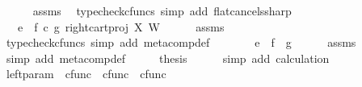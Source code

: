 \begin{isabellebody}
\ \ \ \ \isamarkupfalse%
\ assms\ \isamarkupfalse%
\ {\isacharparenleft}{\kern0pt}typecheck{\isacharunderscore}{\kern0pt}cfuncs{\isacharcomma}{\kern0pt}\ simp\ add{\isacharcolon}{\kern0pt}\ flat{\isacharunderscore}{\kern0pt}cancels{\isacharunderscore}{\kern0pt}sharp{\isacharparenright}{\kern0pt}\isanewline
\ \ \isamarkupfalse%
\ \isamarkupfalse%
\ {\isachardoublequoteopen}{\isachardot}{\kern0pt}{\isachardot}{\kern0pt}{\isachardot}{\kern0pt}\ {\isacharequal}{\kern0pt}\ e\ {\isasymbox}\ {\isacharparenleft}{\kern0pt}f\isactrlsup {\isasymflat}\ {\isasymcirc}\isactrlsub c\ {\isasymlangle}g\isactrlsup {\isasymflat}{\isacharcomma}{\kern0pt}\ right{\isacharunderscore}{\kern0pt}cart{\isacharunderscore}{\kern0pt}proj\ X\ W{\isasymrangle}{\isacharparenright}{\kern0pt}\isactrlsup {\isasymsharp}{\isachardoublequoteclose}\isanewline
\ \ \ \ \isamarkupfalse%
\ assms\ \isamarkupfalse%
\ {\isacharparenleft}{\kern0pt}typecheck{\isacharunderscore}{\kern0pt}cfuncs{\isacharcomma}{\kern0pt}\ simp\ add{\isacharcolon}{\kern0pt}\ meta{\isacharunderscore}{\kern0pt}comp{}{\isacharunderscore}{\kern0pt}def{}{\isacharparenright}{\kern0pt}\isanewline
\ \ \isamarkupfalse%
\ \isamarkupfalse%
\ {\isachardoublequoteopen}{\isachardot}{\kern0pt}{\isachardot}{\kern0pt}{\isachardot}{\kern0pt}\ {\isacharequal}{\kern0pt}\ e\ {\isasymbox}\ {\isacharparenleft}{\kern0pt}f\ {\isasymbox}\ g{\isacharparenright}{\kern0pt}{\isachardoublequoteclose}\isanewline
\ \ \ \ \isamarkupfalse%
\ assms\ \isamarkupfalse%
\ {\isacharparenleft}{\kern0pt}simp\ add{\isacharcolon}{\kern0pt}\ meta{\isacharunderscore}{\kern0pt}comp{}{\isacharunderscore}{\kern0pt}def{}{\isacharparenright}{\kern0pt}\isanewline
\ \ \isamarkupfalse%
\ \isamarkupfalse%
\ {\isacharquery}{\kern0pt}thesis\isanewline
\ \ \ \ \isamarkupfalse%
\ {\isacharparenleft}{\kern0pt}simp\ add{\isacharcolon}{\kern0pt}\ calculation{\isacharparenright}{\kern0pt}\isanewline
{}\isamarkupfalse%
%
\endisatagproof
{\isafoldproof}%
%
\isadelimproof
%
\endisadelimproof
%
\isadelimdocument
%
\endisadelimdocument
%
\isatagdocument
%
\isamarkuptrue%
%
\endisatagdocument
{\isafolddocument}%
%
\isadelimdocument
%
\endisadelimdocument
{}\isamarkupfalse%
\ left{\isacharunderscore}{\kern0pt}param\ {\isacharcolon}{\kern0pt}{\isacharcolon}{\kern0pt}\ {\isachardoublequoteopen}cfunc\ {\isasymRightarrow}\ cfunc\ {\isasymRightarrow}\ cfunc{\isachardoublequoteclose}\ {\isacharparenleft}{\kern0pt}{\isachardoublequoteopen}{\isacharunderscore}{\kern0pt}\isactrlbsub {\isacharbrackleft}{\kern0pt}{\isacharunderscore}{\kern0pt}{\isacharcomma}{\kern0pt}{\isacharminus}{\kern0pt}{\isacharbrackright}{\kern0pt}\isactrlesub {\isachardoublequoteclose}\ {\isacharbrackleft}{\kern0pt}{}{}{}{\isacharcomma}{\kern0pt}{}{\isacharbrackright}{\kern0pt}{}{}{}{\isacharparenright}{\kern0pt}\ \isanewline

\end{isabellebody}

